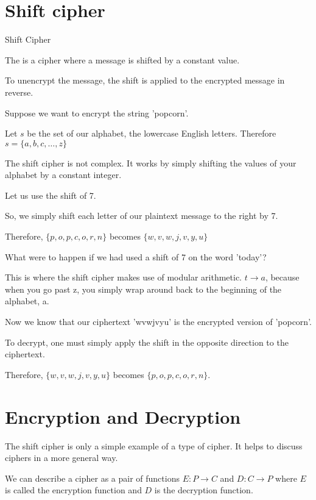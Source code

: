 \section{Shift cipher}


\begin{defn} Shift Cipher \end{defn}

The  is a cipher where a message is shifted by a constant value. 

To unencrypt the message, the shift is applied to the encrypted message in reverse.

\begin{ex}
  Suppose we want to encrypt the string 'popcorn'.

  Let $s$ be the set of our alphabet, the lowercase English letters. Therefore $s = \{a, b, c, \dots, z\}$

  The shift cipher is not complex. It works by simply shifting the values of your alphabet by a constant integer.

  Let us use the shift of 7.

  So, we simply shift each letter of our plaintext message to the right by 7.

  Therefore, $\{p, o, p, c, o, r, n\}$
  becomes $\{w, v, w, j, v, y, u\}$

  What were to happen if we had used a shift of 7 on the word 'today'?

  This is where the shift cipher makes use of modular arithmetic. $t \to a$, because when you go past z, you simply wrap around back to the beginning of the alphabet, a.

  Now we know that our ciphertext 'wvwjvyu' is the encrypted version of 'popcorn'.

  To decrypt, one must simply apply the shift in the opposite direction to the ciphertext.

  Therefore, $\{w, v, w, j, v, y, u\}$ becomes $\{p, o, p, c, o, r, n\}$.
\end{ex}

\section{Encryption and Decryption}

The shift cipher is only a simple example of a type of cipher. It helps to discuss ciphers in a more general way.

We can describe a cipher as a pair of functions $E : P \to C$ and $D : C \to P$ where $E$ is called the encryption function and $D$ is the decryption function.

